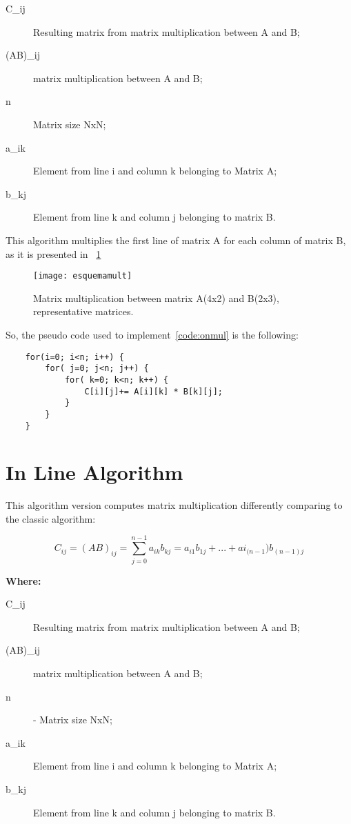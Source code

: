 \begin{description}
	\item [C_{ij}] Resulting matrix from matrix multiplication between A and B;
	\item [(AB)_{ij}] matrix multiplication between A and B;
	\item [n] Matrix size NxN;
	\item [a_{ik}] Element from line i and column k belonging to Matrix A;
	\item [b_{kj}] Element from line k and column j belonging to matrix B.
\end{description}

This algorithm multiplies the first line of matrix A for each column of matrix B, as it is presented in ~\ref{fig:esquemamult}

\begin{figure}[htb]
	\begin{center}
		\leavevmode
		\texttt{[image: esquemamult]}
		\caption{Matrix multiplication between matrix A(4x2) and  B(2x3), representative matrices.}
		\label{fig:esquemamult}
	\end{center}
\end{figure}

So, the pseudo code used to implement~\ref{code:onmul} is the following:

\begin{lstlisting}
	for(i=0; i<n; i++) {	
		for( j=0; j<n; j++) {	
			for( k=0; k<n; k++) {	
				C[i][j]+= A[i][k] * B[k][j];
			}
		}
	}
\end{lstlisting}


\section{In Line Algorithm}

This algorithm version computes matrix multiplication differently comparing to the classic algorithm:

\begin{equation}
C_{ij} = (AB)_{ij} = \sum_{j=0}^{n-1} a_{ik} b_{kj} = a_{i1} b_{1j} + ... + ai_{(n-1})b_{(n-1)j}
\end{equation}

\textbf{Where:}

\begin{description}
	\item [C_{ij}] Resulting matrix from matrix multiplication between A and B;
	\item [(AB)_{ij}] matrix multiplication between A and B;
	\item [n] - Matrix size NxN;
	\item [a_{ik}] Element from line i and column k belonging to Matrix A;
	\item [b_{kj}] Element from line k and column j belonging to matrix B.
\end{description}

